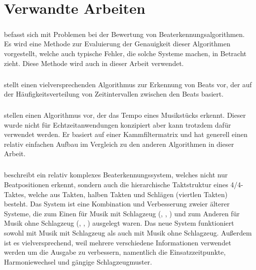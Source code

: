 \chapter{Verwandte Arbeiten}
\label{verwandte_arbeiten}

\paragraph{\cite{1997_GoMu1}}
{
	befasst sich mit Problemen bei der Bewertung von Beaterkennungsalgorithmen.
	Es wird eine Methode zur Evaluierung der Genauigkeit dieser Algorithmen vorgestellt,
		welche auch typische Fehler,
		die solche Systeme machen,
		in Betracht zieht.
	Diese Methode wird auch in dieser Arbeit verwendet.
}


\paragraph{\cite{2000_Di}}
{
	stellt einen vielversprechenden Algorithmus zur Erkennung von Beats vor,
		der auf der Häufigkeitsverteilung von Zeitintervallen zwischen den Beats basiert.
}

\paragraph{\cite{2001_BeatThis}}
{
	stellen einen Algorithmus vor,
		der das Tempo eines Musikstücks erkennt.
	Dieser wurde nicht für Echtzeitanwendungen konzipiert
		aber kann trotzdem dafür verwendet werden.
	Er basiert auf einer Kammfiltermatrix
		und hat generell einen relativ einfachen Aufbau im Vergleich zu den anderen Algorithmen in dieser Arbeit.
}

\paragraph{\cite{2001_Go}}
{
	beschreibt ein relativ komplexes Beaterkennungssystem,
		welches nicht nur Beatpositionen erkennt,
		sondern auch die hierarchische Taktstruktur eines 4/4-Taktes,
		welche aus Takten, halben Takten und Schlägen (viertlen Takten) besteht.
	Das System ist eine Kombination und Verbesserung zweier älterer Systeme,
		die zum Einen für Musik mit Schlagzeug (\cite{1994_GoMu}, \cite{1995_GoMu1}, \cite{1998_GoMu})
		und zum Anderen für Musik ohne Schlagzeug (\cite{1996_GoMu}, \cite{1997_GoMu2}, \cite{1999_GoMu})
		ausgelegt waren.
	Das neue System funktioniert sowohl mit Musik mit Schlagzeug als auch mit Musik ohne Schlagzeug.
	Au{\ss}erdem ist es vielversprechend,
		weil mehrere verschiedene Informationen verwendet werden um die Ausgabe zu verbessern,
		namentlich die Einsatzzeitpunkte, Harmoniewechsel und gängige Schlagzeugmuster.
}

